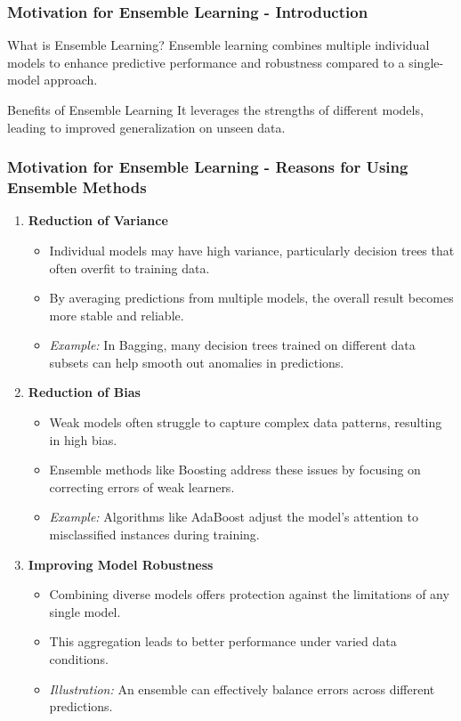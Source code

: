 \documentclass[aspectratio=169]{beamer}
\begin{document}
\begin{frame}[fragile]
    \frametitle{Motivation for Ensemble Learning - Introduction}
    \begin{block}{What is Ensemble Learning?}
        Ensemble learning combines multiple individual models to enhance predictive performance and robustness compared to a single-model approach. 
    \end{block}
    
    \begin{block}{Benefits of Ensemble Learning}
        It leverages the strengths of different models, leading to improved generalization on unseen data.
    \end{block}
\end{frame}

\begin{frame}[fragile]
    \frametitle{Motivation for Ensemble Learning - Reasons for Using Ensemble Methods}
    \begin{enumerate}
        \item \textbf{Reduction of Variance} 
        \begin{itemize}
            \item Individual models may have high variance, particularly decision trees that often overfit to training data.
            \item By averaging predictions from multiple models, the overall result becomes more stable and reliable.
            \item \textit{Example:} In Bagging, many decision trees trained on different data subsets can help smooth out anomalies in predictions.
        \end{itemize}
        
        \item \textbf{Reduction of Bias}
        \begin{itemize}
            \item Weak models often struggle to capture complex data patterns, resulting in high bias.
            \item Ensemble methods like Boosting address these issues by focusing on correcting errors of weak learners.
            \item \textit{Example:} Algorithms like AdaBoost adjust the model's attention to misclassified instances during training.
        \end{itemize}
        
        \item \textbf{Improving Model Robustness}
        \begin{itemize}
            \item Combining diverse models offers protection against the limitations of any single model.
            \item This aggregation leads to better performance under varied data conditions.
            \item \textit{Illustration:} An ensemble can effectively balance errors across different predictions.
        \end{itemize}
    \end{enumerate}
\end{frame}
\end{document}
